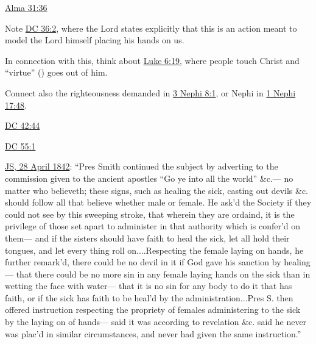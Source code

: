 		\begin{compactitem}
			\item \hyperref[ALMA-31-36]{Alma 31:36}
			\item Note \hyperref[DC36-2]{DC 36:2}, where the Lord states explicitly that this is an action meant to model the Lord himself placing his hands on us.
				\begin{compactitem}
					\item In connection with this, think about \hyperref[LUKE-6-19]{Luke 6:19}, where people touch Christ and ``virtue'' () goes out of him. 
					\item Connect also the righteousness demanded in \hyperref[3NEPHI-8-1]{3 Nephi 8:1}, or Nephi in \hyperref[1NEPHI-17-48]{1 Nephi 17:48}.
				\end{compactitem}
			\item \hyperref[DC42-44]{DC 42:44}
			\item \hyperref[DC55-1]{DC 55:1}
			\item \hyperref[EMS-1842-JS-28-APR-1842]{JS, 28 April 1842}: ``Pres Smith continued the subject by adverting to the commission given to the ancient apostles ``Go ye into all the world'' \&c.--- no matter who believeth; these signs, such as healing the sick, casting out devils \&c. should follow all that believe whether male or female. He ask'd the Society if they could not see by this sweeping stroke, that wherein they are ordaind, it is the privilege of those set apart to administer in that authority which is confer'd on them--- and if the sisters should have faith to heal the sick, let all hold their tongues, and let every thing roll on....Respecting the female laying on hands, he further remark'd, there could be no devil in it if God gave his sanction by healing--- that there could be no more sin in any female laying hands on the sick than in wetting the face with water--- that it is no sin for any body to do it that has faith, or if the sick has faith to be heal'd by the administration...Pres S. then offered instruction respecting the propriety of females administering to the sick by the laying on of hands--- said it was according to revelation \&c. said he never was plac'd in similar circumstances, and never had given the same instruction.''
		\end{compactitem}